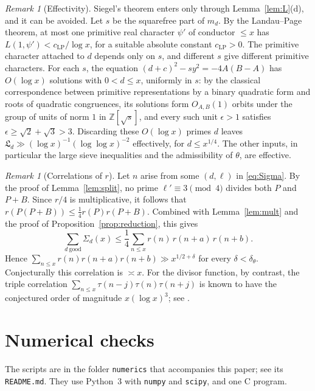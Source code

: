 \documentclass[11pt]{amsart}
\theoremstyle{remark}
\newtheorem{remark}[theorem]{Remark}
\theoremstyle{definition}
\numberwithin{equation}{section}
\newcommand{\Z}{\mathbb{Z}}
\newcommand{\Lf}{\mathfrak{L}}
\begin{document}
\begin{remark}[Effectivity]\label{rem:effective}
Siegel's theorem enters only through Lemma~\ref{lem:L}(d), and it can be avoided. Let $s$ be the squarefree part of $m_d$. By the Landau--Page theorem, at most one primitive real character $\psi'$ of conductor $\le x$ has $L(1,\psi')<c_{\mathrm{LP}}/\log x$, for a suitable absolute constant $c_{\mathrm{LP}}>0$. The primitive character attached to $d$ depends only on $s$, and different $s$ give different primitive characters. For each $s$, the equation $(d+c)^2-sy^2=-4A(B-A)$ has $O(\log x)$ solutions with $0<d\le x$, uniformly in $s$: by the classical correspondence between primitive representations by a binary quadratic form and roots of quadratic congruences, its solutions form $O_{A,B}(1)$ orbits under the group of units of norm $1$ in $\Z[\sqrt s]$, and every such unit $\epsilon>1$ satisfies $\epsilon\ge\sqrt2+\sqrt3>3$. Discarding these $O(\log x)$ primes $d$ leaves $\Lf_d\gg(\log x)^{-1}(\log\log x)^{-2}$ effectively, for $d\le x^{1/4}$. The other inputs, in particular the large sieve inequalities and the admissibility of $\theta$, are effective.
\end{remark}

\begin{remark}[Correlations of $r$]\label{rem:correlation}
Let $n$ arise from some $(d,\ell)$ in \eqref{eq:Sigma}. By the proof of Lemma~\ref{lem:split}, no prime $\ell'\equiv3\pmod4$ divides both $P$ and $P+B$. Since $r/4$ is multiplicative, it follows that $r(P(P+B))\le\frac14r(P)r(P+B)$. Combined with Lemma~\ref{lem:mult} and the proof of Proposition~\ref{prop:reduction}, this gives
\[
\sum_{d\ \mathrm{good}}\Sigma_d(x)\le\frac14\sum_{n\le x}r(n)\,r(n+a)\,r(n+b).
\]
Hence $\sum_{n\le x}r(n)r(n+a)r(n+b)\gg x^{1/2+\delta}$ for every $\delta<\delta_\theta$. Conjecturally this correlation is $\asymp x$. For the divisor function, by contrast, the triple correlation $\sum_{n\le x}\tau(n-j)\tau(n)\tau(n+j)$ is known to have the conjectured order of magnitude $x(\log x)^3$; see \cite{MMS}.
\end{remark}

\section{Numerical checks}\label{sec:numerics}

The scripts are in the folder \texttt{numerics} that accompanies this paper; see its \texttt{README.md}. They use Python~3 with \texttt{numpy} and \texttt{scipy}, and one C program.
\end{document}
